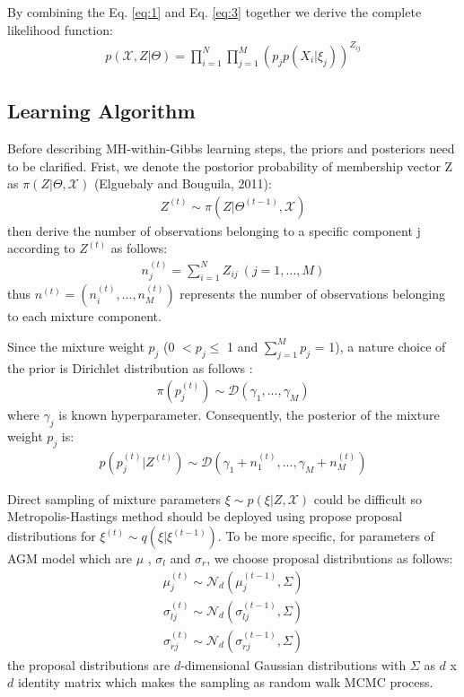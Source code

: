 \documentclass[conference]{llncs}
\begin{document}
By combining the Eq. \eqref{eq:1} and Eq. \eqref{eq:3} together we derive the complete likelihood function:
\begin{align}
p(\mathcal{X}, Z|\Theta) = \prod_{i=1}^{N}\prod_{j=1}^{M}(p_jp(X_i|\xi_j))^{Z_{ij}}
\label{eq:4}
\end{align}

\subsection{Learning Algorithm}
Before describing MH-within-Gibbs learning steps, the priors and posteriors need to be clarified. Frist, we denote the postorior probability of membership vector Z as $\pi(Z|\Theta,\mathcal{X})$ (Elguebaly and Bouguila, 2011)\cite{b11}:
\begin{align}
Z^{(t)} \sim \pi(Z|\Theta^{(t-1)},\mathcal{X})
\label{eq:5}
\end{align}
then derive the number of observations belonging to a specific component j according to $Z^{(t)}$ as follows:
\begin{align}
n_j^{(t)} = \sum_{i=1}^NZ_{ij}\ (j = 1,...,M) 
\label{eq:6}
\end{align}
thus $n^{(t)}=(n_i^{(t)},...,n_M^{(t)})$ represents the number of observations belonging to each mixture component.

Since the mixture weight $p_j$ (0 $< p_j \leq$ 1 and $\sum_{j=1}^Mp_j$ = 1), a nature choice of the prior is Dirichlet distribution as follows \cite{b12}: 
\begin{align}
\pi(p_j^{(t)}) \sim \mathcal{D}(\gamma_1,...,\gamma_M )
\label{eq:7}
\end{align}
where $\gamma_j$ is known hyperparameter. Consequently, the posterior of the mixture weight $p_j$ is:
\begin{align}
p(p_j^{(t)}|Z^{(t)}) \sim \mathcal{D}(\gamma_1 + n_1^{(t)},...,\gamma_M + n_M^{(t)})
\label{eq:8}
\end{align}


Direct sampling of mixture parameters $\xi \sim p(\xi|Z,\mathcal{X})$ could be difficult so Metropolis-Hastings method should be deployed using propose proposal distributions for $\xi^{(t)} \sim q(\xi|\xi^{(t-1)})$. To be more specific, for parameters of AGM model which are $\mu$ , $\sigma_l$ and $\sigma_r$, we choose proposal distributions as follows:
\begin{align}
\mu_j^{(t)} \sim \mathcal{N}_d(\mu_j^{(t-1)},\Sigma)
\label{eq:9}
\end{align}
\begin{align}
\sigma_{lj}^{(t)} \sim \mathcal{N}_d(\sigma_{lj}^{(t-1)},\Sigma)
\label{eq:10}
\end{align}
\begin{align}
\sigma_{rj}^{(t)} \sim \mathcal{N}_d(\sigma_{rj}^{(t-1)},\Sigma)
\label{eq:11}
\end{align}
the proposal distributions are $d$-dimensional Gaussian distributions with $\Sigma$ as $d$ x $d$ identity matrix which makes the sampling as random walk MCMC process.
\end{document}
